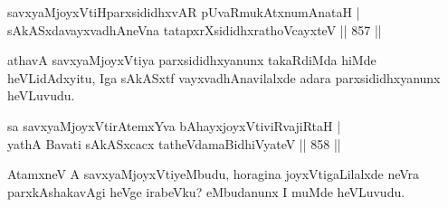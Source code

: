 
\begin{shl}
savxyaMjoyxVtiHparxsididhxvAR pUvaRmukAtx\s numAnataH | \\
sAkASxdavayxvadhAneVna tatapxrXsididhxrathoVcayxteV \hfill||  857 ||  
\end{shl}

\begin{artha}
athavA savxyaMjoyxVtiya parxsididhxyanunx takaRdiMda hiMde heVLidAdxyitu, Iga sAkASxtf vayxvadhAnavilalxde adara parxsididhxyanunx heVLuvudu.
\end{artha}


\begin{shl}
\footnotemark[1]sa savxyaMjoyxVtirAtemxYva bAhayxjoyxVtiviRvajiRtaH | \\
yathA Bavati sAkASxcacx tatheVdamaBidhiVyateV \hfill||  858 ||  
\end{shl}

\begin{artha}
AtamxneV A savxyaMjoyxVtiyeMbudu, horagina joyxVtigaLilalxde neVra parxkAshakavAgi heVge irabeVku? eMbudanunx I muMde heVLuvudu.
\end{artha}


